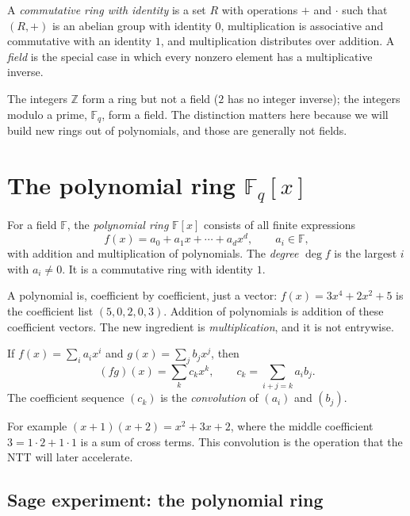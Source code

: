 \begin{definition}
A \emph{commutative ring with identity} is a set $R$ with operations $+$ and $\cdot$ such that $(R,+)$ is an abelian group with identity $0$, multiplication is associative and commutative with an identity $1$, and multiplication distributes over addition. A \emph{field} is the special case in which every nonzero element has a multiplicative inverse.
\end{definition}

The integers $\mathbb{Z}$ form a ring but not a field ($2$ has no integer inverse); the integers modulo a prime, $\mathbb{F}_q$, form a field. The distinction matters here because we will build new rings out of polynomials, and those are generally not fields.

\section{The polynomial ring $\mathbb{F}_q[x]$}
\begin{definition}
For a field $\mathbb{F}$, the \emph{polynomial ring} $\mathbb{F}[x]$ consists of all finite expressions
\[
f(x) = a_0 + a_1 x + \cdots + a_d x^d,\qquad a_i\in\mathbb{F},
\]
with addition and multiplication of polynomials. The \emph{degree} $\deg f$ is the largest $i$ with $a_i\neq 0$. It is a commutative ring with identity $1$.
\end{definition}

A polynomial is, coefficient by coefficient, just a vector: $f(x)=3x^4+2x^2+5$ is the coefficient list $(5,0,2,0,3)$. Addition of polynomials is addition of these coefficient vectors. The new ingredient is \emph{multiplication}, and it is not entrywise.

\begin{proposition}
If $f(x)=\sum_i a_i x^i$ and $g(x)=\sum_j b_j x^j$, then
\[
(fg)(x) = \sum_{k} c_k x^k, \qquad c_k = \sum_{i+j=k} a_i b_j.
\]
The coefficient sequence $(c_k)$ is the \emph{convolution} of $(a_i)$ and $(b_j)$.
\end{proposition}

For example $(x+1)(x+2)=x^2+3x+2$, where the middle coefficient $3=1\cdot 2+1\cdot 1$ is a sum of cross terms. This convolution is the operation that the NTT will later accelerate.

\subsection{Sage experiment: the polynomial ring}

